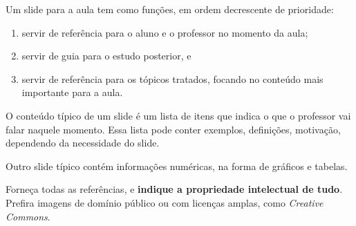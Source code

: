Um slide para a aula tem como funções, em ordem decrescente de prioridade:
\begin{enumerate}
    \item servir de referência para o aluno e o professor no momento da aula;
    \item servir de guia para o estudo posterior, e
    \item servir de referência para os tópicos tratados, focando no conteúdo mais importante para a aula.
\end{enumerate}

O conteúdo típico de um slide é um lista de itens que indica o que o professor vai falar naquele momento. Essa lista pode conter exemplos, definições, motivação, dependendo da necessidade do slide.

Outro slide típico contém informações numéricas, na forma de gráficos e tabelas.

Forneça todas as referências, e \textbf{indique a propriedade intelectual de tudo}. Prefira imagens de domínio público ou com licenças amplas, como \textit{Creative Commons}.


